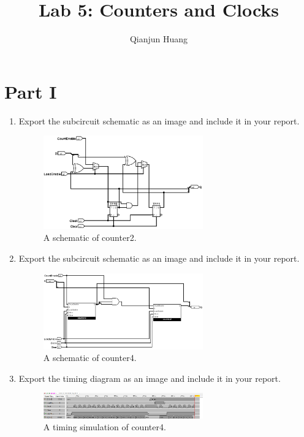 \documentclass{article}
\title{Lab 5: Counters and Clocks}
\author{Qianjun Huang}
\begin{document}
\maketitle

\section{Part I}

\begin{enumerate}
\item Export the subcircuit schematic as an image and include it in your report.

\begin{figure}[ht!]
    \centering
    \includegraphics[width=0.65\textwidth]{lab5_counter2.png}
    \caption{A schematic of counter2.}
    \label{f:counter2}
\end{figure}

\item Export the subcircuit schematic as an image and include it in your report.

\begin{figure}[ht!]
    \centering
    \includegraphics[width=0.65\textwidth]{lab5_counter4.png}
    \caption{A schematic of counter4.}
    \label{f:counter4}
\end{figure}

\item Export the timing diagram as an image and include it in your report.

\begin{figure}[ht!]
    \centering
    \includegraphics[width=0.65\textwidth]{lab5_timing_counter4.png}
    \caption{A timing simulation of counter4.}
    \label{f:counter4_timing}
\end{figure}


\end{enumerate}
\end{document}
